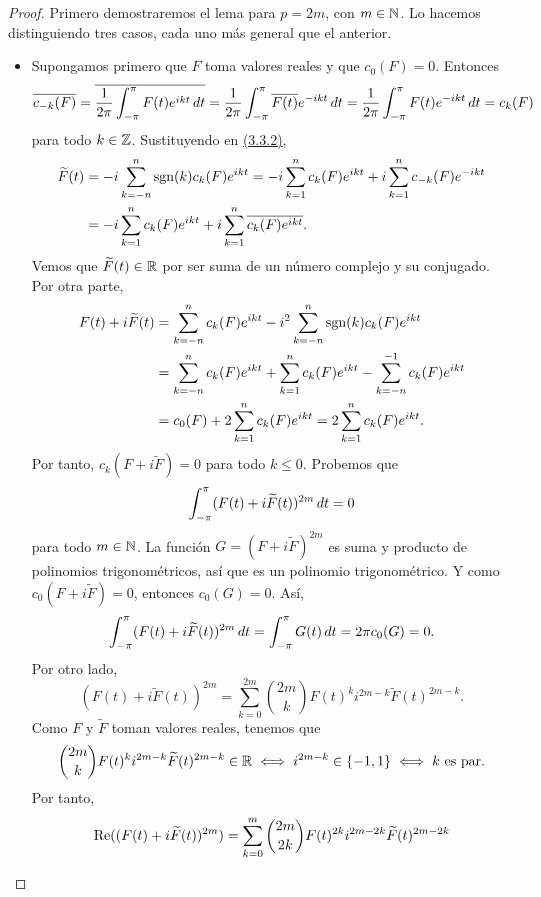 \documentclass[a4paper, 12pt]{book}
\begin{document}
\begin{proof}
    Primero demostraremos el lema para $p = 2m$, con $m \in \mathbb N$. Lo hacemos distinguiendo tres casos, cada uno más general que el anterior.
    \begin{itemize}
        \item Supongamos primero que $F$ toma valores reales y que $c_0(F) = 0$. Entonces
        \[\overline{c_{-k}(F)} = \overline{\frac{1}{2\pi}\int_{-\pi}^{\pi} F(t)e^{ikt} \, dt} = \frac{1}{2\pi}\int_{-\pi}^{\pi} \overline{F(t)}e^{-ikt} \, dt =\frac{1}{2\pi}\int_{-\pi}^{\pi} {F(t)}e^{-ikt} \, dt = c_k(F)\]
        para todo $k\in\mathbb Z$. Sustituyendo en \hyperref[3.3.2]{(3.3.2)},
        \begin{align*}
            \widetilde{F}(t) &= -i\sum_{k=-n}^n \textup{sgn}(k)c_k(F)e^{ikt} = -i\sum_{k=1}^n c_k(F)e^{ikt}+i\sum_{k=1}^{n}c_{-k}(F)e^{-ikt} \\
            &=-i\sum_{k=1}^n c_k(F)e^{ikt}+i\sum_{k=1}^{n}\overline{c_k(F)e^{ikt}}.
        \end{align*}
        Vemos que $\widetilde{F}(t) \in \mathbb R$ por ser suma de un número complejo y su conjugado. Por otra parte,
        \begin{align*}
            F(t)+i\widetilde{F}(t) &= \sum_{k=-n}^n c_k(F)e^{ikt}-i^2\sum_{k=-n}^n \textup{sgn}(k)c_k(F)e^{ikt} \\ 
            &= \sum_{k=-n}^n c_k(F)e^{ikt}+\sum_{k=1}^n c_k(F)e^{ikt} - \sum_{k=-n}^{-1} c_k(F)e^{ikt} \\
            &=c_0(F)+2\sum_{k=1}^n c_k(F)e^{ikt} = 2\sum_{k=1}^n c_k(F)e^{ikt}.
        \end{align*}
        Por tanto, $c_k(F+i\widetilde{F}) = 0$ para todo $k \leq 0$. Probemos que
        \[\int_{-\pi}^{\pi} (F(t)+i\widetilde{F}(t))^{2m} \, dt = 0\]
        para todo $m \in \mathbb N$. La función $G = (F+i\widetilde{F})^{2m}$ es suma y producto de polinomios trigonométricos, así que es un polinomio trigonométrico. Y como $c_0(F+i\widetilde{F}) = 0$, entonces $c_0(G) = 0$. Así,
        \[ \int_{-\pi}^{\pi} (F(t)+i\widetilde{F}(t))^{2m} \, dt = \int_{-\pi}^{\pi} G(t) \, dt = 2\pi c_0(G) = 0.\]
        Por otro lado,
        \[(F(t)+i\widetilde{F}(t))^{2m} = \sum_{k=0}^{2m}\binom{2m}{k}F(t)^ki^{2m-k}\widetilde{F}(t)^{2m-k}.\]Como $F$ y $\widetilde{F}$ toman valores reales, tenemos que
        \[\binom{2m}{k}F(t)^ki^{2m-k}\widetilde{F}(t)^{2m-k} \in \mathbb R \iff i^{2m-k} \in \{-1,1\} \iff k \textup{ es par}.\]
        Por tanto,
        \begin{align*}
            \real((F(t)+i\widetilde{F}(t))^{2m}) &= \sum_{k=0}^{m} \binom{2m}{2k}F(t)^{2k}i^{2m-2k}\widetilde{F}(t)^{2m-2k} \\

\end{align*}
\end{itemize}
\end{proof}
\end{document}
